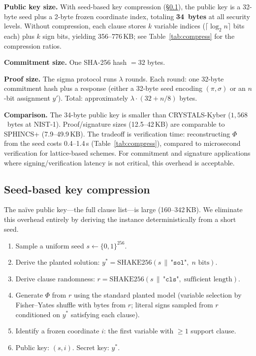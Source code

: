 \documentclass[11pt]{article}
\begin{document}
\noindent\textbf{Public key size.}  With seed-based key compression (\S\ref{sec:seed}), the public key is a 32-byte seed plus a 2-byte frozen coordinate index, totaling \textbf{34~bytes} at all security levels.  Without compression, each clause stores $k$ variable indices ($\lceil \log_2 n \rceil$ bits each) plus $k$ sign bits, yielding 356--776\,KB; see Table~\ref{tab:compress} for the compression ratios.

\noindent\textbf{Commitment size.}  One SHA-256 hash $= 32$ bytes.

\noindent\textbf{Proof size.}  The sigma protocol runs $\lambda$ rounds.  Each round: one 32-byte commitment hash plus a response (either a 32-byte seed encoding $(\pi,\sigma)$ or an $n$-bit assignment $y'$).  Total: approximately $\lambda \cdot (32 + n/8)$ bytes.

\noindent\textbf{Comparison.}  The 34-byte public key is smaller than CRYSTALS-Kyber ($1{,}568$~bytes at NIST-1).  Proof/signature sizes (12.5--42\,KB) are comparable to SPHINCS+ (7.9--49.9\,KB).  The tradeoff is verification time: reconstructing $\Phi$ from the seed costs 0.4--1.4\,s (Table~\ref{tab:compress}), compared to microsecond verification for lattice-based schemes.  For commitment and signature applications where signing/verification latency is not critical, this overhead is acceptable.


\subsection{Seed-based key compression}\label{sec:seed}

The na\"{i}ve public key---the full clause list---is large (160--342\,KB).  We eliminate this overhead entirely by deriving the instance deterministically from a short seed.

\begin{enumerate}
\item Sample a uniform seed $s \leftarrow \{0,1\}^{256}$.
\item Derive the planted solution: $y^* = \mathrm{SHAKE256}(s \,\|\, \texttt{"sol"}, \; n \text{ bits})$.
\item Derive clause randomness: $r = \mathrm{SHAKE256}(s \,\|\, \texttt{"cls"}, \; \text{sufficient length})$.
\item Generate $\Phi$ from $r$ using the standard planted model (variable selection by Fisher--Yates shuffle with bytes from $r$; literal signs sampled from $r$ conditioned on $y^*$ satisfying each clause).
\item Identify a frozen coordinate $i$: the first variable with $\geq 1$ support clause.
\item Public key: $(s, i)$.  Secret key: $y^*$.
\end{enumerate}
\end{document}

